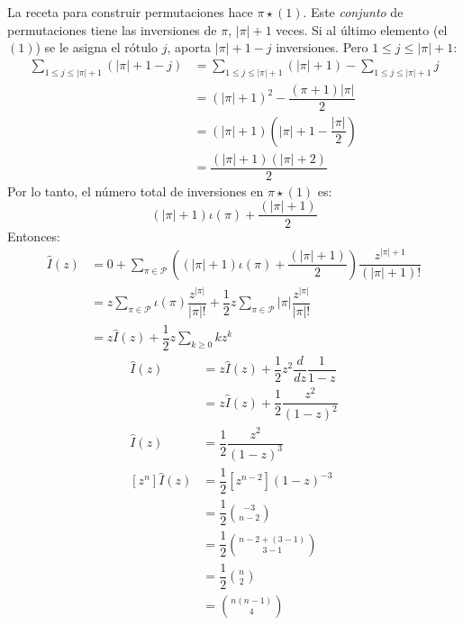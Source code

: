 \documentclass[english, spanish, fleqn, 10pt]{article}
\numberwithin{equation}{section}
\newcommand{\nparentesis}[1]{\left( #1 \right)}
\newcommand{\nabsoluto}[1]{\left| #1 \right|}
\newcommand{\ncorchetes}[1]{\left[ #1 \right]}
\theoremstyle{definition}
\begin{document}
La receta para construir permutaciones hace $\pi \star \nparentesis{1}$. Este \emph{conjunto} de permutaciones tiene las inversiones de $\pi$, $\nabsoluto{\pi} + 1$ veces. Si al último elemento (el $\nparentesis{1}$) se le asigna el rótulo $j$, aporta $\nabsoluto{\pi} + 1 -j$ inversiones. Pero $1 \leq j \leq \nabsoluto{\pi} + 1$:
\begin{align*}
\sum_{1 \leq j \leq \nabsoluto{\pi}+1}\nparentesis{\nabsoluto{\pi} + 1 - j}&=\sum_{1 \leq j \leq \nabsoluto{\pi} + 1} \nparentesis{\nabsoluto{\pi} + 1} - \sum_{1 \leq j \leq \nabsoluto{\pi} + 1}j\\
&= \nparentesis{\nabsoluto{\pi} + 1}^2 - \dfrac{\nparentesis{\pi + 1} \nabsoluto{\pi}}{2}\\
&= \nparentesis{\nabsoluto{\pi} + 1} \nparentesis{\nabsoluto{\pi} + 1-\dfrac{\nabsoluto{\pi}}{2}}\\
&=\dfrac{\nparentesis{\nabsoluto{\pi} + 1} \nparentesis{\nabsoluto{\pi} + 2}}{2}
\end{align*}
Por lo tanto, el número total de inversiones en $\pi \star \nparentesis{1}$ es:
\begin{equation*}
\nparentesis{\nabsoluto{\pi} + 1} \iota\nparentesis{\pi} + \dfrac{\nparentesis{\nabsoluto{\pi} + 1}}{2}
\end{equation*}
Entonces:
\begin{align*}
\hat I \nparentesis{z} &= 0 + \sum_{\pi \in \mathcal{P}}\nparentesis{\nparentesis{\nabsoluto{\pi} + 1} \iota\nparentesis{\pi} + \dfrac{\nparentesis{\nabsoluto{\pi} + 1}}{2}}\dfrac{z^{\nabsoluto{\pi} + 1}}{\nparentesis{\nabsoluto{\pi} + 1}!}\\
&= z \sum_{\pi \in \mathcal{P}}\iota \nparentesis{\pi}\dfrac{z^{\nabsoluto{\pi}}}{\nabsoluto{\pi}!} + \dfrac{1}{2}z\sum_{\pi \in \mathcal{P}}\nabsoluto{\pi} \dfrac{z^{\nabsoluto{\pi}}}{\nabsoluto{\pi}!}\\
&= z \hat I \nparentesis{z} + \dfrac{1}{2}z\sum_{k \geq 0}kz^k
\end{align*}
\begin{align*}
\hat I \nparentesis{z}&=z \hat I \nparentesis{z} + \dfrac{1}{2}z^2 \dfrac{d}{dz} \dfrac{1}{1-z}\\
&= z \hat I \nparentesis{z} + \dfrac{1}{2}\dfrac{z^2}{\nparentesis{1-z}^2}\\
\hat I \nparentesis{z} &= \dfrac{1}{2} \dfrac{z^2}{\nparentesis{1-z}^3}\\
\ncorchetes{z^n} \hat I \nparentesis{z} &= \dfrac{1}{2}\ncorchetes{z^{n-2}}\nparentesis{1-z} ^{-3}\\
&= \dfrac{1}{2}\binom{-3}{n-2}\\
&= \dfrac{1}{2}\binom{n-2 + \nparentesis{3-1}}{3-1}\\
&= \dfrac{1}{2}\binom{n}{2}\\
&=\binom{n\nparentesis{n-1}}{4}
\end{align*}
\end{document}
